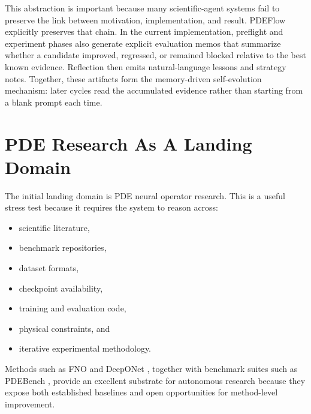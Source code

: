 \documentclass[11pt]{article}
\begin{document}
This abstraction is important because many scientific-agent systems fail to preserve the link between motivation, implementation, and result. PDEFlow explicitly preserves that chain. In the current implementation, preflight and experiment phases also generate explicit evaluation memos that summarize whether a candidate improved, regressed, or remained blocked relative to the best known evidence. Reflection then emits natural-language lessons and strategy notes. Together, these artifacts form the memory-driven self-evolution mechanism: later cycles read the accumulated evidence rather than starting from a blank prompt each time.

\section{PDE Research As A Landing Domain}
The initial landing domain is PDE neural operator research. This is a useful stress test because it requires the system to reason across:
\begin{itemize}[leftmargin=1.5em]
  \item scientific literature,
  \item benchmark repositories,
  \item dataset formats,
  \item checkpoint availability,
  \item training and evaluation code,
  \item physical constraints, and
  \item iterative experimental methodology.
\end{itemize}

Methods such as FNO \cite{li2020fno} and DeepONet \cite{lu2021deeponet}, together with benchmark suites such as PDEBench \cite{takamoto2022pdebench}, provide an excellent substrate for autonomous research because they expose both established baselines and open opportunities for method-level improvement.
\end{document}
